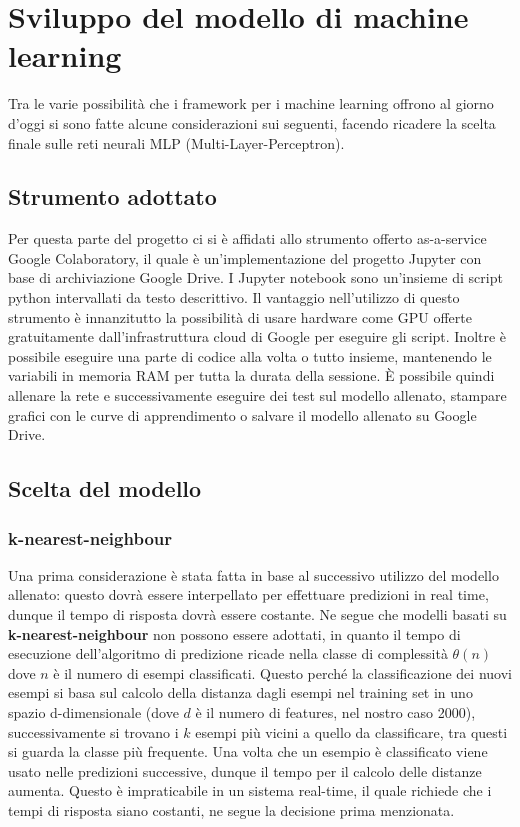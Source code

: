 \section{Sviluppo del modello di machine learning}
Tra le varie possibilità che i framework per i machine learning offrono al giorno d'oggi si sono fatte alcune considerazioni sui seguenti, facendo ricadere la scelta finale sulle reti neurali MLP (Multi-Layer-Perceptron).

\subsection{Strumento adottato}
Per questa parte del progetto ci si è affidati allo strumento offerto as-a-service Google Colaboratory, il quale è un'implementazione del progetto Jupyter con base di archiviazione Google Drive.
I Jupyter notebook sono un'insieme di script python intervallati da testo descrittivo.
Il vantaggio nell'utilizzo di questo strumento è innanzitutto la possibilità di usare hardware come GPU offerte gratuitamente dall'infrastruttura cloud di Google per eseguire gli script. Inoltre è possibile eseguire una parte di codice alla volta o tutto insieme, mantenendo le variabili in memoria RAM per tutta la durata della sessione. È possibile quindi allenare la rete e successivamente eseguire dei test sul modello allenato, stampare grafici con le curve di apprendimento o salvare il modello allenato su Google Drive.

\subsection{Scelta del modello}
\subsubsection{k-nearest-neighbour}
Una prima considerazione è stata fatta in base al successivo utilizzo del modello allenato: questo dovrà essere interpellato per effettuare predizioni in real time, dunque il tempo di risposta dovrà essere costante. Ne segue che modelli basati su \textbf{k-nearest-neighbour} non possono essere adottati, in quanto il tempo di esecuzione dell'algoritmo di predizione ricade nella classe di complessità $\theta (n)$ dove $n$ è il numero di esempi classificati. Questo perché la classificazione dei nuovi esempi si basa sul calcolo della distanza dagli esempi nel training set in uno spazio d-dimensionale (dove $d$ è il numero di features, nel nostro caso 2000), successivamente si trovano i $k$ esempi più vicini a quello da classificare, tra questi si guarda la classe più frequente. Una volta che un esempio è classificato viene usato nelle predizioni successive, dunque il tempo per il calcolo delle distanze aumenta. Questo è impraticabile in un sistema real-time, il quale richiede che i tempi di risposta siano costanti, ne segue la decisione prima menzionata.

